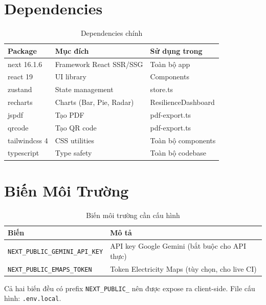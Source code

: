 \documentclass[12pt,a4paper]{article}
\begin{document}
\section{Dependencies}

\begin{table}[h]
    \centering
    \begin{tabular}{lll}
        \toprule
        \textbf{Package} & \textbf{Mục đích} & \textbf{Sử dụng trong} \\
        \midrule
        next 16.1.6    & Framework React SSR/SSG & Toàn bộ app \\
        react 19       & UI library              & Components \\
        zustand        & State management         & store.ts \\
        recharts       & Charts (Bar, Pie, Radar) & ResilienceDashboard \\
        jspdf          & Tạo PDF                  & pdf-export.ts \\
        qrcode         & Tạo QR code              & pdf-export.ts \\
        tailwindcss 4  & CSS utilities            & Toàn bộ components \\
        typescript     & Type safety              & Toàn bộ codebase \\
        \bottomrule
    \end{tabular}
    \caption{Dependencies chính}
\end{table}

\section{Biến Môi Trường}

\begin{table}[h]
    \centering
    \begin{tabular}{lp{8cm}}
        \toprule
        \textbf{Biến} & \textbf{Mô tả} \\
        \midrule
        \texttt{NEXT\_PUBLIC\_GEMINI\_API\_KEY} & API key Google Gemini (bắt buộc cho API thực) \\
        \texttt{NEXT\_PUBLIC\_EMAPS\_TOKEN} & Token Electricity Maps (tùy chọn, cho live CI) \\
        \bottomrule
    \end{tabular}
    \caption{Biến môi trường cần cấu hình}
\end{table}

Cả hai biến đều có prefix \texttt{NEXT\_PUBLIC\_} nên được expose ra client-side. File cấu hình: \texttt{.env.local}.
\end{document}
